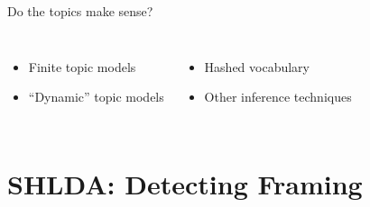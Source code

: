 \documentclass[compress]{beamer}
\begin{document}
\begin{frame}{Do the topics make sense?}

\begin{columns}
\begin{itemize}
  \item Finite topic models
  \item ``Dynamic'' topic models
\end{itemize}

\begin{itemize}
  \item Hashed vocabulary
  \item Other inference techniques
\end{itemize}
\end{columns}


\end{frame}



%


\section{SHLDA: Detecting Framing}

\providecommand{\shlda}{\textsc{ShLDA}}
\end{document}
